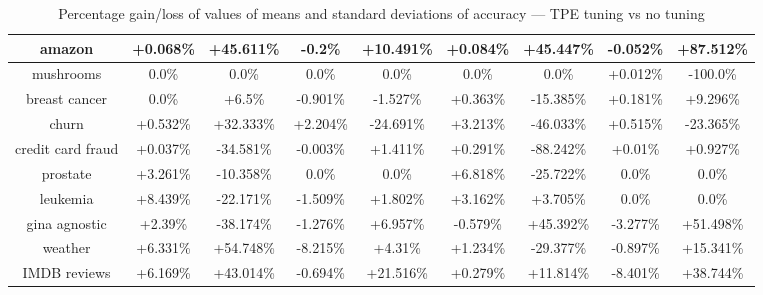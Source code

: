 \documentclass[magisterska, english]{pwr_wmat_praca_dyplomowa}
\theoremstyle{plain}
\numberwithin{theorem}{chapter}
\theoremstyle{definition}
\numberwithin{theorem}{chapter}
\begin{document}
\begin{sidewaystable}
\begin{tabular}{c|cccccccc}
amazon & +0.068\% & +45.611\% & -0.2\% & +10.491\% & +0.084\% & +45.447\% & -0.052\% & +87.512\%\\ \hline
mushrooms & 0.0\% & 0.0\% & 0.0\% & 0.0\% & 0.0\% & 0.0\% & +0.012\% & -100.0\%\\ \hline
breast cancer & 0.0\% & +6.5\% & -0.901\% & -1.527\% & +0.363\% & -15.385\% & +0.181\% & +9.296\%\\ \hline
churn & +0.532\% & +32.333\% & +2.204\% & -24.691\% & +3.213\% & -46.033\% & +0.515\% & -23.365\%\\ \hline
credit card fraud & +0.037\% & -34.581\% & -0.003\% & +1.411\% & +0.291\% & -88.242\% & +0.01\% & +0.927\%\\ \hline
prostate & +3.261\% & -10.358\% & 0.0\% & 0.0\% & +6.818\% & -25.722\% & 0.0\% & 0.0\%\\ \hline
leukemia & +8.439\% & -22.171\% & -1.509\% & +1.802\% & +3.162\% & +3.705\% & 0.0\% & 0.0\%\\ \hline
gina agnostic & +2.39\% & -38.174\% & -1.276\% & +6.957\% & -0.579\% & +45.392\% & -3.277\% & +51.498\%\\ \hline
weather & +6.331\% & +54.748\% & -8.215\% & +4.31\% & +1.234\% & -29.377\% & -0.897\% & +15.341\%\\ \hline
IMDB reviews & +6.169\% & +43.014\% & -0.694\% & +21.516\% & +0.279\% & +11.814\% & -8.401\% & +38.744\%\\ \hline
\end{tabular}
\caption{Percentage gain/loss of values of means and standard deviations of accuracy --- TPE tuning vs no tuning}
\label{tab:no_tuning_tpe_accuracy_diff}


\end{sidewaystable}
\end{document}
